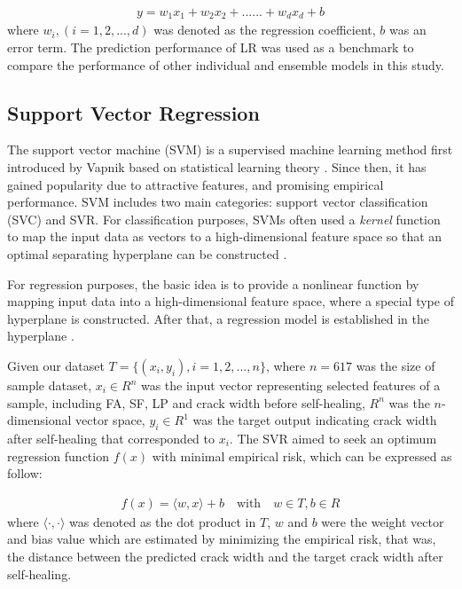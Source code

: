 \documentclass[11pt]{article}
\begin{document}
	\begin{eqnarray}
	y = w_1 x_1 + w_2 x_2 + ......+ w_d x_d +b                                                      
	\end{eqnarray}
	where $w_i, (i = 1,2,...,d)$ was denoted as the regression coefficient, $b$ was an error term. The prediction performance of LR was used as a benchmark to compare the performance of other individual and ensemble models in this study. 
	
	\subsection{Support Vector Regression}
	
	The support vector machine (SVM) is a supervised machine learning method first introduced by Vapnik \cite{cortes1995support,vapnik1999overview} based on statistical learning theory \cite{juncai2015prediction}. Since then, it has gained popularity due to attractive features, and promising empirical performance. SVM includes two main categories: support vector classification (SVC) and SVR. For classification purposes, SVMs often used a \textit{kernel} function to map the input data as vectors to a high-dimensional feature space so that an optimal separating hyperplane can be constructed \cite{suykens1999least}. 
	
	For regression purposes, the basic idea is to provide a nonlinear function by mapping input data into a high-dimensional feature space, where a special type of hyperplane is constructed. After that, a regression model is established in the hyperplane \cite{li2007consensus}. 
	
	Given our dataset $T = \{ (x_i,y_i), i = 1,2,...,n\}$, where $n = 617$ was the size of sample dataset, $x_i \in R^n$ was the input vector representing selected features of a sample, including FA, SF, LP and crack width before self-healing, $R^n$ was the $n$-dimensional vector space, $y_i \in R^1$ was the target output indicating crack width after self-healing that corresponded to $x_i$. The SVR aimed to seek an optimum regression function $f(x)$ with minimal empirical risk, which can be expressed as follow:
	
	\begin{eqnarray}
	f(x) = \langle w,x \rangle + b \quad \text{with} \quad w \in T, b \in R                                                              
	\end{eqnarray}
	where $\langle \cdot, \cdot \rangle$ was denoted as the dot product in $T$, $w$ and $b$ were the weight vector and bias value which are estimated by minimizing the empirical risk, that was, the distance between the predicted crack width and the target crack width after self-healing.  
	
\end{document}
